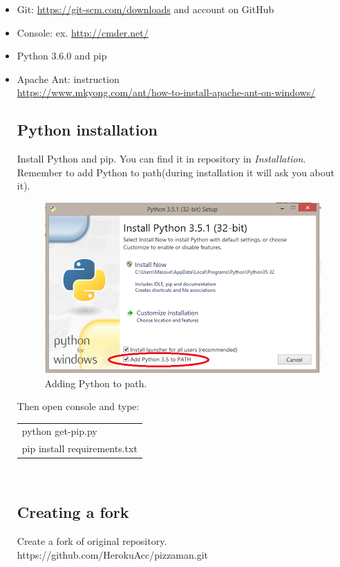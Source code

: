 \documentclass[12pt,a4paper]{article}
\begin{document}
\begin{itemize}
\item Git: \url{https://git-scm.com/downloads} and account on GitHub
\item Console: ex. \url{http://cmder.net/}
\item Python 3.6.0 and pip
\item Apache Ant: instruction\\ \url{https://www.mkyong.com/ant/how-to-install-apache-ant-on-windows/} 

\subsection{Python installation}
Install Python and pip. You can find it in repository in \textit{Installation}.
Remember to add Python to path(during installation it will ask you about it).\\

\begin{figure}[H]
\centering
\includegraphics{images/python.PNG}
\caption{Adding Python to path.}
\label{fig:path}
\end{figure}

Then open console and type:

\begin{tabular}{|l|}
	\hline
	python get-pip.py\\
	pip install requirements.txt\\
	\hline
\end{tabular}\\

\subsection{Creating a fork}
Create a fork of original repository. \\
https://github.com/HerokuAcc/pizzaman.git\\


\end{itemize}
\end{document}
